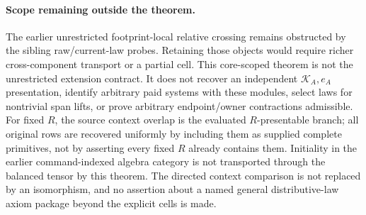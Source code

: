 \documentclass[11pt]{article}
\begin{document}
\paragraph{Scope remaining outside the theorem.}
The earlier unrestricted footprint-local relative crossing remains obstructed by the sibling raw/current-law probes. Retaining those objects would require richer cross-component transport or a partial cell. This core-scoped theorem is not the unrestricted extension contract. It does not recover an independent $\mathcal K_A,e_A$ presentation, identify arbitrary paid systems with these modules, select laws for nontrivial span lifts, or prove arbitrary endpoint/owner contractions admissible. For fixed $R$, the source context overlap is the evaluated $R$-presentable branch; all original rows are recovered uniformly by including them as supplied complete primitives, not by asserting every fixed $R$ already contains them. Initiality in the earlier command-indexed algebra category is not transported through the balanced tensor by this theorem. The directed context comparison is not replaced by an isomorphism, and no assertion about a named general distributive-law axiom package beyond the explicit cells is made. 
\end{document}
